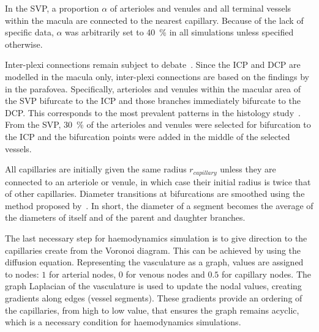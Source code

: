 \documentclass[11pt,]{article}
\begin{document}
In the SVP, a proportion $\alpha$ of arterioles and venules and all terminal vessels within the macula are connected to the nearest capillary. Because of the lack of specific data, $\alpha$ was arbitrarily set to \SI{40}{\percent} in all simulations unless specified otherwise.

Inter-plexi connections remain subject to debate~\cite{An2020,Chiaravalli2022,Campbell2017}.
Since the ICP and DCP are modelled in the macula only, inter-plexi connections are based on the findings by~\cite{An2020} in the parafovea.
Specifically, arterioles and venules within the macular area of the SVP bifurcate to the ICP and those branches immediately bifurcate to the DCP.
This corresponds to the most prevalent patterns in the histology study~\cite{An2020}.
From the SVP, \SI{30}{\percent} of the arterioles and venules were selected for bifurcation to the ICP and the bifurcation points were added in the middle of the selected vessels.

All capillaries are initially given the same radius $r_{capillary}$ unless they are connected to an arteriole or venule, in which case their initial radius is twice that of other capillaries.
Diameter transitions at bifurcations are smoothed using the method proposed by~\cite{Linninger2013}.
In short, the diameter of a segment becomes the average of the diameters of itself and of the parent and daughter branches.

The last necessary step for haemodynamics simulation is to give direction to the capillaries create from the Voronoi diagram.
This can be achieved by using the diffusion equation.
Representing the vasculature as a graph, values are assigned to nodes: $1$ for arterial nodes, $0$ for venous nodes and $0.5$ for capillary nodes.
The graph Laplacian of the vasculature is used to update the nodal values, creating gradients along edges (vessel segments).
These gradients provide an ordering of the capillaries, from high to low value, that ensures the graph remains acyclic, which is a necessary condition for haemodynamics simulations.
\end{document}

